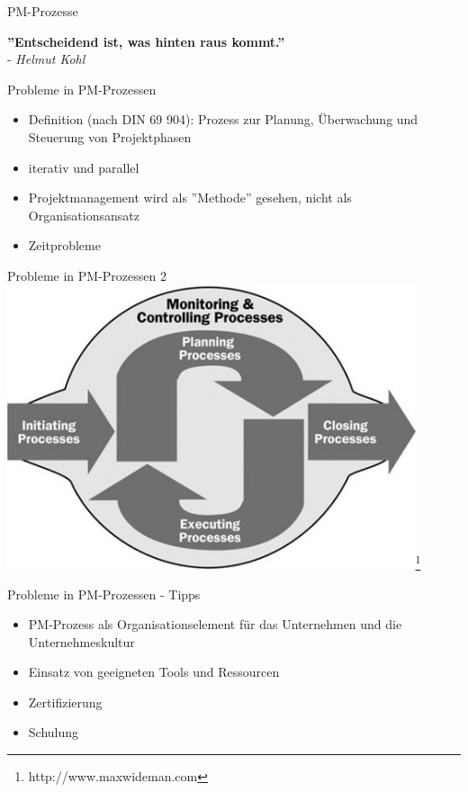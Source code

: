 \documentclass[12pt]{beamer}
\begin{document}
	\begin{frame}{PM-Prozesse}
		
		\textbf{''Entscheidend ist, was hinten raus kommt.''}\\
		- \textit{Helmut Kohl}
		
	\end{frame}
	
	\begin{frame}{Probleme in PM-Prozessen}
		\begin{itemize}
			\item{Definition (nach DIN 69 904): Prozess zur Planung, Überwachung und Steuerung von Projektphasen}
			\item{iterativ und parallel}
			\item{Projektmanagement wird als ''Methode'' gesehen, nicht als Organisationsansatz}
			\item{Zeitprobleme}
		\end{itemize}
	\end{frame}
	
	\begin{frame}{Probleme in PM-Prozessen 2}
		\includegraphics[width=0.9\textwidth]{images/pm_process}\footnote{http://www.maxwideman.com}
	\end{frame}
	
	\begin{frame}{Probleme in PM-Prozessen - Tipps}
		\begin{itemize}
			\item{PM-Prozess als Organisationselement für das Unternehmen und die Unternehmeskultur}
			\item{Einsatz von geeigneten Tools und Ressourcen}
			\item{Zertifizierung}
			\item{Schulung}
		\end{itemize}
		
	\end{frame}
	
\end{document}
